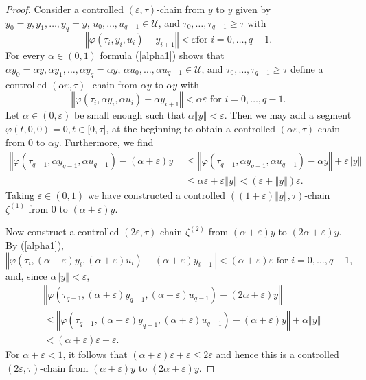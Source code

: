 \documentclass[10pt,a4paper]{amsart}
\begin{document}
\begin{proof}
Consider a controlled $(\varepsilon,\tau)$-chain from $y$ to $y$ given by
$y_{0}=y,y_{1},\ldots,y_{q}=y,\allowbreak\,u_{0},\ldots,u_{q-1}\in\mathcal{U}%
$, and $\tau_{0},\ldots,\tau_{q-1}\geq\tau$ with%
\[
\left\Vert \varphi(\tau_{i},y_{i},u_{i})-y_{i+1}\right\Vert <\varepsilon\text{
for }i=0,\ldots,q-1.
\]
For every $\alpha\in(0,1)$ formula (\ref{alpha1}) shows that $\alpha
y_{0}=\alpha y,\alpha y_{1},\ldots,\alpha y_{q}=\alpha y,\,\allowbreak\alpha
u_{0},\ldots,\allowbreak\alpha u_{q-1}\in\mathcal{U}$, and $\tau_{0}%
,\ldots,\tau_{q-1}\geq\tau$ define a controlled $(\alpha\varepsilon,\tau)$-
chain from $\alpha y$ to $\alpha y$ with%
\[
\left\Vert \varphi(\tau_{i},\alpha y_{i},\alpha u_{i})-\alpha y_{i+1}%
\right\Vert <\alpha\varepsilon\text{ for }i=0,\ldots,q-1.
\]
Let $\alpha\in(0,\varepsilon)$ be small enough such that $\alpha\left\Vert
y\right\Vert <\varepsilon$. Then we may add a segment $\varphi(t,0,0)=0,t\in
\lbrack0,\tau]$, at the beginning to obtain a controlled $(\alpha
\varepsilon,\tau)$-chain from $0$ to $\alpha y$. Furthermore, we find%
\begin{align*}
\left\Vert \varphi(\tau_{q-1},\alpha y_{q-1},\alpha u_{q-1})-(\alpha
+\varepsilon)y\right\Vert  &  \leq\left\Vert \varphi(\tau_{q-1},\alpha
y_{q-1},\alpha u_{q-1})-\alpha y\right\Vert +\varepsilon\left\Vert
y\right\Vert \\
&  \leq\alpha\varepsilon+\varepsilon\left\Vert y\right\Vert <(\varepsilon
+\left\Vert y\right\Vert )\varepsilon.
\end{align*}
Taking $\varepsilon\in(0,1)$ we have constructed a controlled $((1+\varepsilon
)\left\Vert y\right\Vert ,\tau)$-chain $\zeta^{(1)}$ from $0$ to
$(\alpha+\varepsilon)y$.

Now construct a controlled $(2\varepsilon,\tau)$-chain $\zeta^{(2)}$ from
$(\alpha+\varepsilon)y$ to $(2\alpha+\varepsilon)y$. By (\ref{alpha1}),%
\[
\left\Vert \varphi(\tau_{i},(\alpha+\varepsilon)y_{i},(\alpha+\varepsilon
)u_{i})-(\alpha+\varepsilon)y_{i+1}\right\Vert <(\alpha+\varepsilon
)\varepsilon\text{ for }i=0,\ldots,q-1,
\]
and, since $\alpha\left\Vert y\right\Vert <\varepsilon$,%
\begin{align*}
&  \left\Vert \varphi(\tau_{q-1},(\alpha+\varepsilon)y_{q-1},(\alpha
+\varepsilon)u_{q-1})-(2\alpha+\varepsilon)y\right\Vert \\
&  \leq\left\Vert \varphi(\tau_{q-1},(\alpha+\varepsilon)y_{q-1}%
,(\alpha+\varepsilon)u_{q-1})-(\alpha+\varepsilon)y\right\Vert +\alpha
\left\Vert y\right\Vert \\
&  <(\alpha+\varepsilon)\varepsilon+\varepsilon.
\end{align*}
For $\alpha+\varepsilon<1$, it follows that $(\alpha+\varepsilon
)\varepsilon+\varepsilon\leq2\varepsilon$ and hence this is a controlled
$(2\varepsilon,\tau)$-chain from $(\alpha+\varepsilon)y$ to $(2\alpha
+\varepsilon)y$.


\end{proof}
\end{document}
